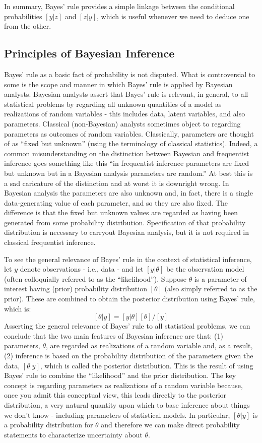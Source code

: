 In summary, Bayes' rule provides a simple linkage between the
conditional probabilities $[y|z]$ and $[z|y]$, which is useful whenever
we need to deduce one from the other.

\subsection{Principles of Bayesian Inference}

Bayes' rule as a basic fact of probability is not disputed.
What is controversial to some is the scope and manner in which Bayes'
rule is applied by Bayesian analysts. Bayesian analysts assert that
Bayes' rule is relevant, in general, to all statistical problems by
regarding all unknown quantities of a model as realizations of random
variables - this includes data, latent variables, and also
parameters. Classical (non-Bayesian) analysts sometimes object to
regarding parameters as outcomes of random variables. Classically,
parameters are thought of as ``fixed but unknown'' (using the
terminology of classical statistics).
Indeed, a common misunderstanding on the distinction between Bayesian and
frequentist inference goes something like this ``in frequentist
inference parameters are fixed but unknown but in a Bayesian analysis
parameters are random.'' At best this is a sad caricature of the
distinction and at worst it is downright wrong. 
In Bayesian analysis the
parameters are also unknown and, in fact, there is a single data-generating
value of each parameter, and so they are also fixed.
The difference is that the fixed
but unknown values are  regarded as having been generated from some
probability distribution. Specification of that probability
distribution is necessary to carryout Bayesian analysis, but it is not
required in classical frequentist inference.


To see the general relevance of Bayes' rule in the context of
statistical inference, let $y$ denote observations - i.e., data -
and let $[y|\theta]$ be the observation model (often colloquially
referred to as the ``likelihood'').  Suppose $\theta$ 
is a parameter of
interest having (prior) probability distribution $[\theta]$ (also simply referred to as the prior). These are
combined to obtain the posterior distribution using Bayes' rule, which
is:
\[
 [\theta|y]= [y|\theta][\theta]/[y]
\]
Asserting the general relevance of Bayes' rule to all statistical
problems, we can conclude that the two main features of Bayesian
inference are that: (1) parameters, $\theta$, are regarded as realizations of
a random variable and, as a result, (2) inference is based on the
probability distribution of the parameters given the data,
$[\theta|y]$,
which is
called the posterior distribution. This is the result of using Bayes'
rule to combine the ``likelihood'' and the prior distribution.  The
key concept is regarding parameters as realizations of a random
variable because, once you admit this conceptual view, this leads
directly to the posterior distribution, a very natural quantity upon
which to base inference about things we don't know -  including
parameters of statistical models.  In particular, $[\theta|y]$ is a
probability distribution for $\theta$ and therefore we can make direct
probability statements to characterize uncertainty about
$\theta$.

